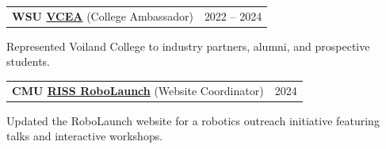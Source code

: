 \documentclass[margin,line]{res}
\begin{document}
\begin{resume}
\begin{tabularx}{\textwidth}{@{}X r@{}}
\textbf{WSU \href{https://vcea.wsu.edu/student-success/}{\textcolor{cvblue}{VCEA}}} (College Ambassador) & {2022 -- 2024} \\
\end{tabularx}
Represented Voiland College to industry partners, alumni, and prospective students.

\begin{tabularx}{\textwidth}{@{}X r@{}}
\textbf{CMU \href{https://riss.ri.cmu.edu/robolaunch/}{\textcolor{cvblue}{RISS RoboLaunch}}} (Website Coordinator) & {2024} \\
\end{tabularx}
Updated the RoboLaunch website for a robotics outreach initiative featuring talks and interactive workshops.


\end{resume}
\end{document}
